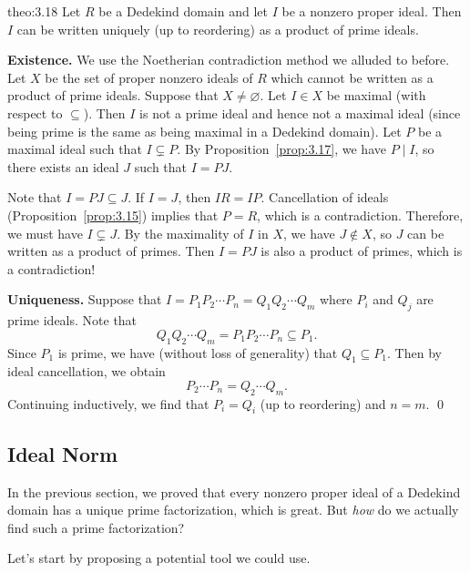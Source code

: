 \begin{theo}{theo:3.18}
    Let $R$ be a Dedekind domain and let $I$ be a nonzero proper ideal. 
    Then $I$ can be written uniquely (up to reordering) as a product 
    of prime ideals. 
\end{theo}\vspace{-0.25cm}
\begin{pf}
    {\bf Existence.} We use the Noetherian contradiction method 
    we alluded to before. Let $X$ be the set of proper nonzero ideals of $R$ 
    which cannot be written as a product of prime ideals. Suppose that 
    $X \neq \varnothing$. Let $I \in X$ be maximal (with respect to 
    $\subseteq$). Then $I$ is not a prime ideal and hence not a maximal ideal 
    (since being prime is the same as being maximal in a Dedekind domain).
    Let $P$ be a maximal ideal such that $I \subsetneq P$. By 
    Proposition~\ref{prop:3.17}, we have $P \mid I$, so there exists an ideal 
    $J$ such that $I = PJ$.

    Note that $I = PJ \subseteq J$. If $I = J$, then $IR = IP$.
    Cancellation of ideals (Proposition~\ref{prop:3.15}) implies that 
    $P = R$, which is a contradiction. Therefore, we must have $I \subsetneq J$. 
    By the maximality of $I$ in $X$, we have $J \notin X$, so $J$ 
    can be written as a product of primes. Then $I = PJ$ is also a product 
    of primes, which is a contradiction! 

    {\bf Uniqueness.} Suppose that $I = P_1P_2 \cdots P_n = Q_1Q_2 \cdots Q_m$ 
    where $P_i$ and $Q_j$ are prime ideals. Note that 
    \[ Q_1 Q_2 \cdots Q_m = P_1 P_2 \cdots P_n \subseteq P_1. \] 
    Since $P_1$ is prime, we have (without loss of generality) that 
    $Q_1 \subseteq P_1$. Then by ideal cancellation, we obtain 
    \[ P_2 \cdots P_n = Q_2 \cdots Q_m. \] 
    Continuing inductively, we find that $P_i = Q_i$ (up to reordering) 
    and $n = m$. \qed 
\end{pf}

\subsection{Ideal Norm} \label{subsec:3.4}
In the previous section, we proved that every nonzero proper ideal of a 
Dedekind domain has a unique prime factorization, which is great. 
But \emph{how} do we actually find such a prime factorization?

Let's start by proposing a potential tool we could use. 

